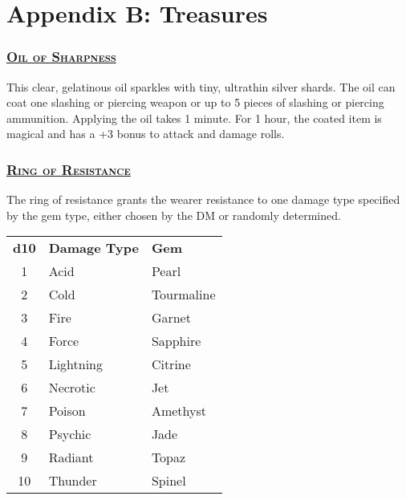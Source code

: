 \section{Appendix B: Treasures}

\subsubsection*{\underline{\textsc{\Large Oil of Sharpness}}}
This clear, gelatinous oil sparkles with tiny, ultrathin silver shards. The oil can coat one slashing or piercing weapon or up to 5 pieces of slashing or piercing ammunition. Applying the oil takes 1 minute. For 1 hour, the coated item is magical and has a +3 bonus to attack and damage rolls.
	
\subsubsection*{\underline{\textsc{\Large Ring of Resistance}}}
The ring of resistance grants the wearer resistance to one damage type specified by the gem type, either chosen by the DM or randomly determined.

\begin{table}[H]
	\begin{tabular}{cll}
		\textbf{d10} & \textbf{Damage Type} & \textbf{Gem} \\
		1 & Acid & Pearl \\
		2 & Cold & Tourmaline \\
		3 & Fire & Garnet \\
		4 & Force & Sapphire \\
		5 & Lightning & Citrine \\
		6 & Necrotic & Jet \\
		7 & Poison & Amethyst \\
		8 & Psychic & Jade \\
		9 & Radiant & Topaz \\
		10 & Thunder & Spinel \\
	\end{tabular}
\end{table}